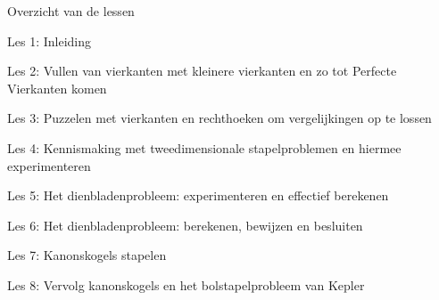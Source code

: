 \documentclass[dutch]{beamer}
\begin{document}
\begin{frame}
{Overzicht van de lessen}
\begin{list}{\quad}{}
\item Les 1: Inleiding
\item Les 2: Vullen van vierkanten met kleinere vierkanten en zo tot Perfecte Vierkanten komen
\item Les 3: Puzzelen met vierkanten en rechthoeken om vergelijkingen op te lossen
\item Les 4: Kennismaking met tweedimensionale stapelproblemen en hiermee experimenteren
\item Les 5: Het dienbladenprobleem: experimenteren en effectief berekenen
\item Les 6: Het dienbladenprobleem: berekenen, bewijzen en besluiten
\item Les 7: Kanonskogels stapelen
\item Les 8: Vervolg kanonskogels en het bolstapelprobleem van Kepler
\end{list}
\end{frame}




\end{document}
